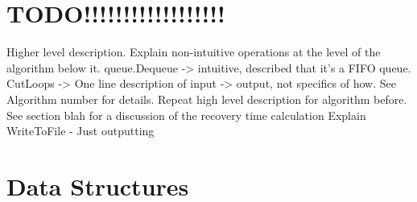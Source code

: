 \documentclass[12pt,final,oneside]{article} %
\begin{document}
   \section{TODO!!!!!!!!!!!!!!!!!!}
      Higher level description.
      Explain non-intuitive operations at the level of the algorithm below it.
      queue.Dequeue -> intuitive, described that it's a FIFO queue.
      CutLoops -> One line description of input -> output, not specifics of how. See Algorithm number for details.
      Repeat high level description for algorithm before.
      See section blah for a discussion of the recovery time calculation
      Explain WriteToFile - Just outputting 


\section{Data Structures}
\end{document}
